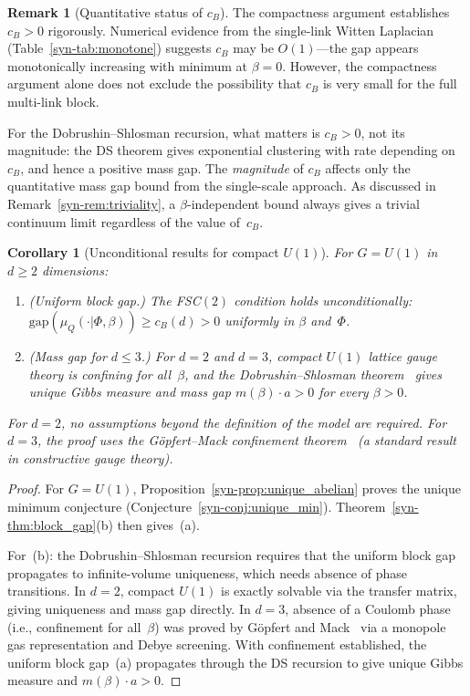 \documentclass[11pt]{article}
\newtheorem{corollary}[theorem]{Corollary}
\theoremstyle{definition}
\newtheorem{remark}[theorem]{Remark}
\newcommand{\gap}{\mathrm{gap}}
\begin{document}
\begin{remark}[Quantitative status of $c_B$]
\label{syn-rem:fsc_order1}
The compactness argument establishes $c_B > 0$ rigorously.
Numerical evidence from the single-link Witten Laplacian
(Table~\ref{syn-tab:monotone}) suggests $c_B$ may be $O(1)$---the
gap appears monotonically increasing with minimum at $\beta = 0$.
However, the compactness argument alone does not exclude the
possibility that $c_B$ is very small for the full multi-link
block.

For the Dobrushin--Shlosman recursion, what matters is
$c_B > 0$, not its magnitude: the DS theorem gives exponential
clustering with rate depending on~$c_B$, and hence a positive
mass gap.  The \emph{magnitude} of $c_B$ affects only the
quantitative mass gap bound from the single-scale approach.
As discussed in Remark~\ref{syn-rem:triviality}, a
$\beta$-independent bound always gives a trivial continuum limit
regardless of the value of~$c_B$.
\end{remark}

\begin{corollary}[Unconditional results for compact $U(1)$]
\label{syn-cor:U1}
For $G = U(1)$ in $d \geq 2$ dimensions:
\begin{enumerate}[label=\textup{(\alph*)},nosep]
  \item \textup{(Uniform block gap.)}
    The FSC$(2)$ condition holds unconditionally:
    $\gap(\mu_Q(\cdot|\Phi, \beta))
    \geq c_B(d) > 0$ uniformly in $\beta$ and~$\Phi$.
  \item \textup{(Mass gap for $d \leq 3$.)}
    For $d = 2$ and $d = 3$, compact $U(1)$ lattice gauge
    theory is confining for all~$\beta$, and the
    Dobrushin--Shlosman
    theorem~\cite{DobrushinShlosman,Martinelli1999}
    gives unique Gibbs measure and mass gap
    $m(\beta) \cdot a > 0$ for every $\beta > 0$.
\end{enumerate}
For $d = 2$, no assumptions beyond the definition of the
model are required.  For $d = 3$, the proof uses the
G\"opfert--Mack confinement theorem~\cite{GopfertMack82}
(a standard result in constructive gauge theory).
\end{corollary}

\begin{proof}
For $G = U(1)$, Proposition~\ref{syn-prop:unique_abelian} proves
the unique minimum conjecture
(Conjecture~\ref{syn-conj:unique_min}).
Theorem~\ref{syn-thm:block_gap}(b) then gives~(a).

For~(b): the Dobrushin--Shlosman recursion requires that
the uniform block gap propagates to infinite-volume
uniqueness, which needs absence of phase transitions.
In $d = 2$, compact $U(1)$ is exactly solvable via the
transfer matrix, giving uniqueness and mass gap directly.
In $d = 3$, absence of a Coulomb phase (i.e., confinement
for all~$\beta$) was proved by
G\"opfert and Mack~\cite{GopfertMack82}
via a monopole gas representation and Debye screening.
With confinement established, the uniform block gap~(a)
propagates through the DS recursion to give unique
Gibbs measure and $m(\beta) \cdot a > 0$.
\end{proof}
\end{document}

